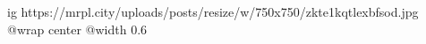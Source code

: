  
 
 
 
 

\ifcmt
  ig https://mrpl.city/uploads/posts/resize/w/750x750/zkte1kqtlexbfsod.jpg
  @wrap center
  @width 0.6
\fi
